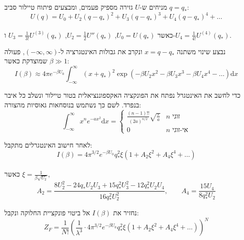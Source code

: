 \documentclass{tstextbook}
\begin{document}
\begin{definition}
מניחים ש-\(U\) גזירה מספיק פעמים, ומבצעים פיתוח טיילור סביב \(q = q_*\):\\
$$U(q) = U_0 + U_2 (q - q_*)^2 + U_3 (q - q_*)^3 + U_4 (q - q_*)^4 + \dots
$$\\

כאשר \(U_0 = U(q_*)\), \(U_2 = \frac{1}{2} U''(q_*)\), \(U_3 = \frac{1}{3!} U^{(3)}(q_*)\) ו-\(U_4 = \frac{1}{4!} U^{(4)}(q_*)\).

\end{definition}
\begin{proposition}
נבצע שינוי משתנה \(x = q - q_*\) ונקרב את גבולות האינטגרציה ל-\((-\infty, \infty)\), פעולה שמוצדקת כאשר \(\beta \gg 1\):\\
$$I(\beta) \approx 4\pi e^{ -\beta U_0 } \int_{-\infty}^{\infty} (x + q_*)^2 \exp \left( -\beta U_2 x^2 - \beta U_3 x^3 - \beta U_4 x^4 - \dots \right) \mathrm{d}x
$$

\end{proposition}
\begin{remark}
כדי לחשב את האינטגרל נפתח את הפונקציה האקספוננציאלית בטור טיילור ונשלב כל איבר בנפרד. לשם כך נשתמש בנוסחאות גאוסיות מהצורה:\\
$$\int_{-\infty}^{\infty} x^n e^{-a x^2} \mathrm{d}x =\begin{cases}\frac{(n-1)!!}{(2a)^{n/2}} \sqrt{ \frac{\pi}{a} } & n \text{ זוגי} \\0 & n \text{ אי-זוגי}\end{cases}
$$

\end{remark}
\begin{proposition}
לאחר חישוב האינטגרלים מתקבל:\\
$$I(\beta) = 4\pi^{3/2} e^{ -\beta U_0 } q_*^2 \xi \left( 1 + A_2 \xi^2 + A_4 \xi^4 + \dots \right)
$$\\

כאשר \(\xi = \frac{1}{\beta \sqrt{U_2}}\),
$$A_2 = \frac{8U_2^2 - 24q_*U_2 U_3 + 15q_*^2 U_3^2 - 12 q_*^2 U_2 U_4}{16 q_*^2 U_2^2}, \qquad A_4 = \frac{15 U_4}{8 q_*^2 U_2}
$$

\end{proposition}
\begin{definition}
נחזיר את \(I(\beta)\) אל ביטוי פונקציית החלוקה ונקבל:\\
$$Z_F = \frac{1}{N!} \left( \frac{1}{\lambda^3} \cdot 4\pi^{3/2} e^{ -\beta U_0 } q_*^2 \xi \left( 1 + A_2 \xi^2 + A_4 \xi^4 + \dots \right) \right)^N
$$

\end{definition}
\end{document}
